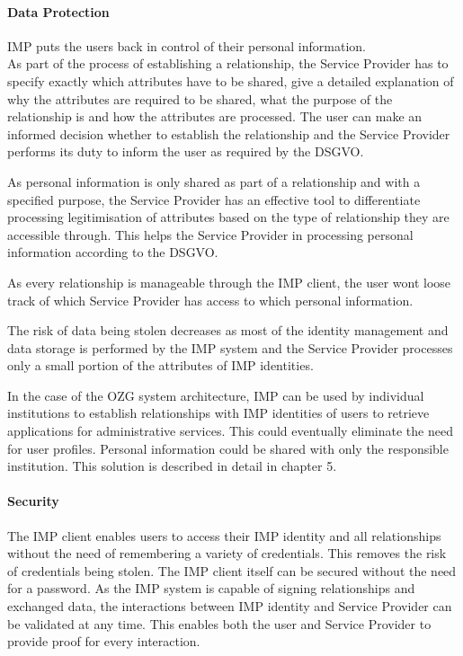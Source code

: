 \paragraph{Data Protection}

IMP puts the users back in control of their personal information. \\
As part of the process of establishing a relationship, the Service Provider has to specify exactly which attributes have to be shared, give a detailed explanation of why the attributes are required to be shared, what the purpose of the relationship is and how the attributes are processed. The user can make an informed decision whether to establish the relationship and the Service Provider performs its duty to inform the user as required by the DSGVO.

As personal information is only shared as part of a relationship and with a specified purpose, the Service Provider has an effective tool to differentiate processing legitimisation of attributes based on the type of relationship they are accessible through. This helps the Service Provider in processing personal information according to the DSGVO.

As every relationship is manageable through the IMP client, the user wont loose track of which Service Provider has access to which personal information.

The risk of data being stolen decreases as most of the identity management and data storage is performed by the IMP system and the Service Provider processes only a small portion of the attributes of IMP identities.

In the case of the OZG system architecture, IMP can be used by individual institutions to establish relationships with IMP identities of users to retrieve applications for administrative services. This could eventually eliminate the need for user profiles. Personal information could be shared with only the responsible institution. This solution is described in detail in chapter 5.

\paragraph{Security}

The IMP client enables users to access their IMP identity and all relationships without the need of remembering a variety of credentials. This removes the risk of credentials being stolen. The IMP client itself can be secured without the need for a password. As the IMP system is capable of signing relationships and exchanged data, the interactions between IMP identity and Service Provider can be validated at any time. This enables both the user and Service Provider to provide proof for every interaction.

